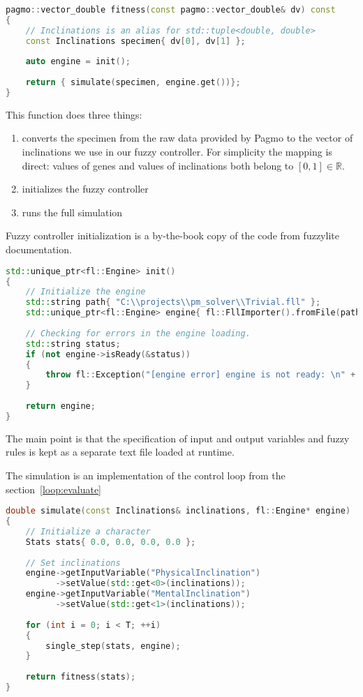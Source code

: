 \documentclass[12pt, a4paper]{article}
\begin{document}
	\begin{lstlisting}[language=c++]
pagmo::vector_double fitness(const pagmo::vector_double& dv) const
{
	// Inclinations is an alias for std::tuple<double, double>
	const Inclinations specimen{ dv[0], dv[1] };
	
	auto engine = init();
	
	return { simulate(specimen, engine.get())};
}
	\end{lstlisting}
	
	This function does three things:
	
	\begin{enumerate}
		\item converts the specimen from the raw data provided by Pagmo to the vector of inclinations we use in our fuzzy controller. For simplicity the mapping is direct: values of genes and values of inclinations both belong to $[0, 1] \in \mathbb{R}$.
		\item initializes the fuzzy controller
		\item runs the full simulation
	\end{enumerate}
	
	Fuzzy controller initialization is a by-the-book copy of the code from fuzzylite documentation.
	
	\begin{lstlisting}[language=c++]
std::unique_ptr<fl::Engine> init()
{
	// Initialize the engine
	std::string path{ "C:\\projects\\pm_solver\\Trivial.fll" };
	std::unique_ptr<fl::Engine> engine{ fl::FllImporter().fromFile(path) };
	
	// Checking for errors in the engine loading.
	std::string status;
	if (not engine->isReady(&status))
	{
		throw fl::Exception("[engine error] engine is not ready: \n" + status);
	}
	
	return engine;
}
	\end{lstlisting}
	
	The main point is that the specification of input and output variables and fuzzy rules is kept as a separate text file loaded at runtime.
	
	The simulation is an implementation of the control loop from the section~\ref{loop:evaluate}
	
	\begin{lstlisting}[language=c++]
double simulate(const Inclinations& inclinations, fl::Engine* engine)
{
	// Initialize a character
	Stats stats{ 0.0, 0.0, 0.0, 0.0 };
	
	// Set inclinations
	engine->getInputVariable("PhysicalInclination")
		  ->setValue(std::get<0>(inclinations));
	engine->getInputVariable("MentalInclination")
	      ->setValue(std::get<1>(inclinations));
	
	for (int i = 0; i < T; ++i)
	{
		single_step(stats, engine);
	}
	
	return fitness(stats);
}
	\end{lstlisting}
	
\end{document}
